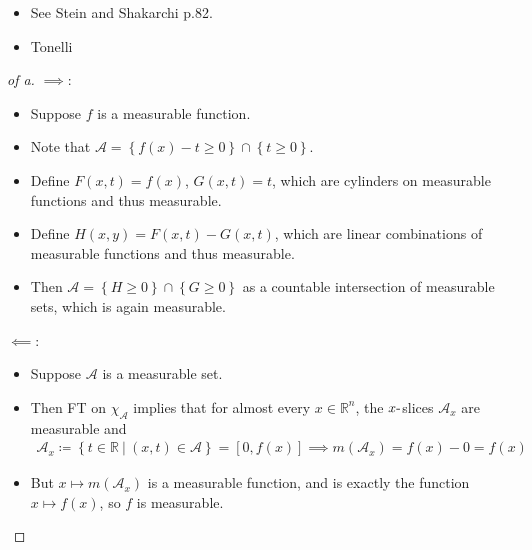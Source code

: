 
\begin{concept}

\envlist

\begin{itemize}
\tightlist
\item
  See Stein and Shakarchi p.82.
\item
  Tonelli
\end{itemize}

\end{concept}

\begin{solution}

\envlist

\begin{proof}[of a]

\(\implies\):

\begin{itemize}
\tightlist
\item
  Suppose \(f\) is a measurable function.
\item
  Note that
  \(\mathcal{A} = \left\{{f(x) - t \geq 0}\right\} \cap\left\{{t \geq 0}\right\}\).
\item
  Define \(F(x, t) = f(x)\), \(G(x, t) = t\), which are cylinders on
  measurable functions and thus measurable.
\item
  Define \(H(x, y) = F(x, t) - G(x, t)\), which are linear combinations
  of measurable functions and thus measurable.
\item
  Then
  \(\mathcal{A} = \left\{{H \geq 0}\right\} \cap\left\{{G \geq 0}\right\}\)
  as a countable intersection of measurable sets, which is again
  measurable.
\end{itemize}

\(\impliedby\):

\begin{itemize}
\item
  Suppose \({\mathcal{A}}\) is a measurable set.
\item
  Then FT on \(\chi_{{\mathcal{A}}}\) implies that for almost every
  \(x\in {\mathbb{R}}^n\), the \(x{\hbox{-}}\)slices \({\mathcal{A}}_x\)
  are measurable and
  \begin{align*}
  \mathcal{A}_x \coloneqq\left\{{t\in {\mathbb{R}}{~\mathrel{\Big|}~}(x, t) \in \mathcal{A}}\right\} = [0, f(x)] \implies m(\mathcal A_x) = f(x) - 0 = f(x)
  \end{align*}
\item
  But \(x \mapsto m(\mathcal A_x)\) is a measurable function, and is
  exactly the function \(x \mapsto f(x)\), so \(f\) is measurable.
\end{itemize}


\end{proof}
\end{solution}
